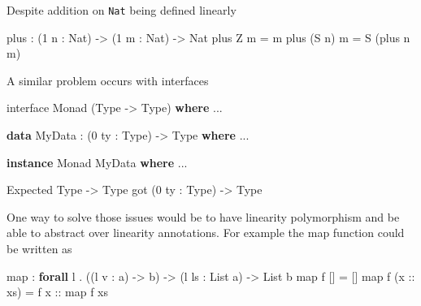 \documentclass[
]{article}
\newenvironment{Shaded}{}{}
\newcommand{\DataTypeTok}[1]{\textcolor[rgb]{0.56,0.13,0.00}{#1}}
\newcommand{\DecValTok}[1]{\textcolor[rgb]{0.25,0.63,0.44}{#1}}
\newcommand{\FunctionTok}[1]{\textcolor[rgb]{0.02,0.16,0.49}{#1}}
\newcommand{\KeywordTok}[1]{\textcolor[rgb]{0.00,0.44,0.13}{\textbf{#1}}}
\newcommand{\NormalTok}[1]{#1}
\newcommand{\OperatorTok}[1]{\textcolor[rgb]{0.40,0.40,0.40}{#1}}
\newcommand{\OtherTok}[1]{\textcolor[rgb]{0.00,0.44,0.13}{#1}}
\begin{document}
Despite addition on \texttt{Nat} being defined linearly

\begin{Shaded}
\begin{Highlighting}[]
\NormalTok{plus }\OperatorTok{:}\NormalTok{ (}\DecValTok{1}\NormalTok{ n }\OperatorTok{:} \DataTypeTok{Nat}\NormalTok{) }\OtherTok{{-}\textgreater{}}\NormalTok{ (}\DecValTok{1}\NormalTok{ m }\OperatorTok{:} \DataTypeTok{Nat}\NormalTok{) }\OtherTok{{-}\textgreater{}} \DataTypeTok{Nat}
\NormalTok{plus }\DataTypeTok{Z}\NormalTok{ m }\OtherTok{=}\NormalTok{ m}
\NormalTok{plus (}\DataTypeTok{S}\NormalTok{ n) m }\OtherTok{=} \DataTypeTok{S}\NormalTok{ (plus n m)}
\end{Highlighting}
\end{Shaded}

A similar problem occurs with interfaces

\begin{Shaded}
\begin{Highlighting}[]
\NormalTok{interface }\DataTypeTok{Monad}\NormalTok{ (}\DataTypeTok{Type} \OtherTok{{-}\textgreater{}} \DataTypeTok{Type}\NormalTok{) }\KeywordTok{where}
    \OperatorTok{...}

\KeywordTok{data} \DataTypeTok{MyData} \OperatorTok{:}\NormalTok{ (}\DecValTok{0}\NormalTok{ ty }\OperatorTok{:} \DataTypeTok{Type}\NormalTok{) }\OtherTok{{-}\textgreater{}} \DataTypeTok{Type} \KeywordTok{where}
    \OperatorTok{...}

\KeywordTok{instance} \DataTypeTok{Monad} \DataTypeTok{MyData} \KeywordTok{where}
    \OperatorTok{...}
\end{Highlighting}
\end{Shaded}

\begin{Shaded}
\begin{Highlighting}[]
\DataTypeTok{Expected} \DataTypeTok{Type} \OtherTok{{-}\textgreater{}} \DataTypeTok{Type}
\NormalTok{got (}\DecValTok{0}\NormalTok{ ty }\OperatorTok{:} \DataTypeTok{Type}\NormalTok{) }\OtherTok{{-}\textgreater{}} \DataTypeTok{Type}
\end{Highlighting}
\end{Shaded}

One way to solve those issues would be to have linearity polymorphism
and be able to abstract over linearity annotations. For example the map
function could be written as

\begin{Shaded}
\begin{Highlighting}[]
\FunctionTok{map} \OperatorTok{:} \KeywordTok{forall}\NormalTok{ l }\OperatorTok{.}\NormalTok{ ((l v }\OperatorTok{:}\NormalTok{ a) }\OtherTok{{-}\textgreater{}}\NormalTok{ b) }\OtherTok{{-}\textgreater{}}\NormalTok{ (l ls }\OperatorTok{:} \DataTypeTok{List}\NormalTok{ a) }\OtherTok{{-}\textgreater{}} \DataTypeTok{List}\NormalTok{ b}
\FunctionTok{map}\NormalTok{ f [] }\OtherTok{=}\NormalTok{ []}
\FunctionTok{map}\NormalTok{ f (}\OtherTok{x ::}\NormalTok{ xs) }\OtherTok{=}\NormalTok{ f}\OtherTok{ x ::} \FunctionTok{map}\NormalTok{ f xs}
\end{Highlighting}
\end{Shaded}
\end{document}
